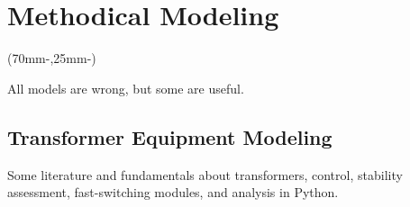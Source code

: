 


\chapter{Methodical Modeling}


\begin{textblock*}{.7\textwidth}(70mm-\offset,25mm-\offset)
        \begin{fquote}
            All models are wrong, but some are useful.
        \end{fquote}
\end{textblock*}

\section{Transformer Equipment Modeling}


Some literature and fundamentals about transformers, control, stability assessment, fast-switching modules, and analysis in Python. %


